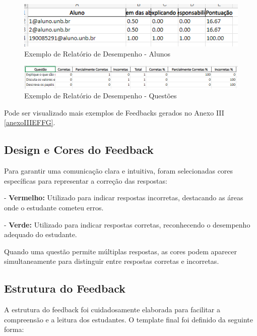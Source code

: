 \begin{figure}[H]
    \centering
    \includegraphics[width=1\textwidth]{figuras/report.png}
    \caption{Exemplo de Relatório de Desempenho - Alunos}
    \label{fig:report}
\end{figure}

\begin{figure}[H]
    \centering
    \includegraphics[width=1\textwidth]{figuras/report_questions.png}
    \caption{Exemplo de Relatório de Desempenho - Questões}
    \label{fig:report_questions}
\end{figure}

Pode ser visualizado mais exemplos de Feedbacks gerados no Anexo III \ref{anexoIIIEFFG}.

\subsection{Design e Cores do Feedback}

Para garantir uma comunicação clara e intuitiva, foram selecionadas cores específicas para representar a correção das respostas:

- \textbf{Vermelho:} Utilizado para indicar respostas incorretas, destacando as áreas onde o estudante cometeu erros.

- \textbf{Verde:} Utilizado para indicar respostas corretas, reconhecendo o desempenho adequado do estudante.

Quando uma questão permite múltiplas respostas, as cores podem aparecer simultaneamente para distinguir entre respostas corretas e incorretas.

\subsection{Estrutura do Feedback}

A estrutura do feedback foi cuidadosamente elaborada para facilitar a compreensão e a leitura dos estudantes. O template final foi definido da seguinte forma:

